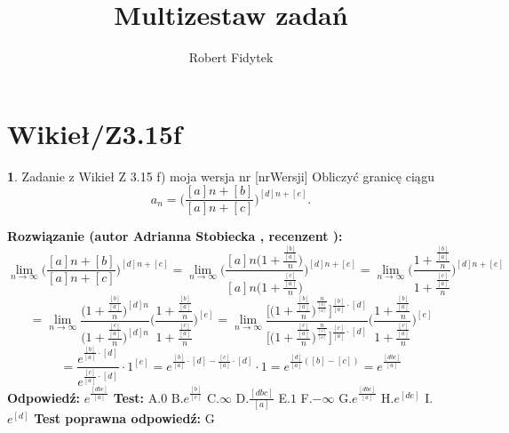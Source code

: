 \documentclass[12pt, a4paper]{article}
\title{Multizestaw zadań}
\author{Robert Fidytek}
\date{}
\theoremstyle{definition} %
\newtheorem{zad}{}
\newcommand{\kategoria}[1]{\section{#1}} %
\newcommand{\zadStart}[1]{\begin{zad}#1\newline} %
\newcommand{\zadStop}{\end{zad}}   %
\newcommand{\rozwStart}[2]{\noindent \textbf{Rozwiązanie (autor #1 , recenzent #2): }\newline} %
\newcommand{\rozwStop}{\newline}                                            %
\newcommand{\odpStart}{\noindent \textbf{Odpowiedź:}\newline}    %
\newcommand{\odpStop}{\newline}                                             %
\newcommand{\testStart}{\noindent \textbf{Test:}\newline} %
\newcommand{\testStop}{\newline} %
\newcommand{\kluczStart}{\noindent \textbf{Test poprawna odpowiedź:}\newline} %
\newcommand{\kluczStop}{\newline} %
\begin{document}
\maketitle


\kategoria{Wikieł/Z3.15f}
\zadStart{Zadanie z Wikieł Z 3.15 f) moja wersja nr [nrWersji]}
Obliczyć granicę ciągu 
$$a_n=\bigg(\frac{[a]n+[b]}{[a]n+[c]}\bigg)^{[d]n+[e]}.$$
\zadStop
\rozwStart{Adrianna Stobiecka}{}
$$\lim_{n\to\infty}\bigg(\frac{[a]n+[b]}{[a]n+[c]}\bigg)^{[d]n+[e]}=\lim_{n\to\infty}\Bigg(\frac{[a]n\big(1+\frac{\frac{[b]}{[a]}}{n}\big)}{[a]n\big(1+\frac{\frac{[c]}{[a]}}{n}\big)}\Bigg)^{[d]n+[e]}=\lim_{n\to\infty}\Bigg(\frac{1+\frac{\frac{[b]}{[a]}}{n}}{1+\frac{\frac{[c]}{[a]}}{n}}\Bigg)^{[d]n+[e]}$$
$$=\lim_{n\to\infty}\frac{\big(1+\frac{\frac{[b]}{[a]}}{n}\big)^{[d]n}}{\big(1+\frac{\frac{[c]}{[a]}}{n}\big)^{[d]n}}\Bigg(\frac{1+\frac{\frac{[b]}{[a]}}{n}}{1+\frac{\frac{[c]}{[a]}}{n}}\Bigg)^{[e]}=\lim_{n\to\infty}\frac{\big[\big(1+\frac{\frac{[b]}{[a]}}{n}\big)^{\frac{n}{\frac{[b]}{[a]}}}\big]^{\frac{[b]}{[a]}\cdot[d]}}{\big[\big(1+\frac{\frac{[c]}{[a]}}{n}\big)^{\frac{n}{\frac{[c]}{[a]}}}\big]^{\frac{[c]}{[a]}\cdot[d]}}\Bigg(\frac{1+\frac{\frac{[b]}{[a]}}{n}}{1+\frac{\frac{[c]}{[a]}}{n}}\Bigg)^{[e]}$$
$$=\frac{e^{\frac{[b]}{[a]}\cdot[d]}}{e^{\frac{[c]}{[a]}\cdot[d]}}\cdot1^{[e]}=e^{\frac{[b]}{[a]}\cdot[d]-\frac{[c]}{[a]}\cdot[d]}\cdot1=e^{\frac{[d]}{[a]}([b]-[c])}=e^{\frac{[dbc]}{[a]}}$$
\rozwStop
\odpStart
$e^{\frac{[dbc]}{[a]}}$
\odpStop
\testStart
A.$0$
B.$e^{\frac{[b]}{[c]}}$
C.$\infty$
D.$\frac{[dbc]}{[a]}$
E.$1$
F.$-\infty$
G.$e^{\frac{[dbc]}{[a]}}$
H.$e^{[de]}$
I.$e^{[d]}$
\testStop
\kluczStart
G
\kluczStop
\end{document}
